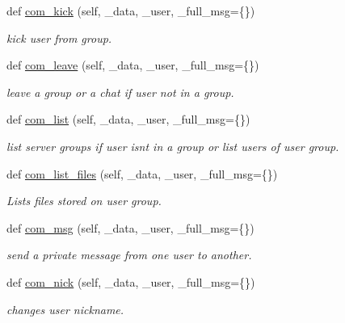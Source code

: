 \begin{DoxyCompactItemize}
def \hyperlink{classlib_1_1server_1_1_server_ac47e8a01071e003d2c1401a55d055132}{com\+\_\+kick} (self, \+\_\+data, \+\_\+user, \+\_\+full\+\_\+msg=\{\})
\begin{DoxyCompactList}\small\item\em kick user from group. \end{DoxyCompactList}\item 
def \hyperlink{classlib_1_1server_1_1_server_aca808a3a7ea205cef5c0d556c8b03ecf}{com\+\_\+leave} (self, \+\_\+data, \+\_\+user, \+\_\+full\+\_\+msg=\{\})
\begin{DoxyCompactList}\small\item\em leave a group or a chat if user not in a group. \end{DoxyCompactList}\item 
def \hyperlink{classlib_1_1server_1_1_server_a9fcc590e919c1877295ed150f851b469}{com\+\_\+list} (self, \+\_\+data, \+\_\+user, \+\_\+full\+\_\+msg=\{\})
\begin{DoxyCompactList}\small\item\em list server groups if user isn\textquotesingle{}t in a group or list users of user group. \end{DoxyCompactList}\item 
def \hyperlink{classlib_1_1server_1_1_server_a17bdb51a017c2a09b95fff98da8d64ad}{com\+\_\+list\+\_\+files} (self, \+\_\+data, \+\_\+user, \+\_\+full\+\_\+msg=\{\})
\begin{DoxyCompactList}\small\item\em Lists files stored on user group. \end{DoxyCompactList}\item 
def \hyperlink{classlib_1_1server_1_1_server_ae632e88e7a3e8d83bf8a7efdcab61cf2}{com\+\_\+msg} (self, \+\_\+data, \+\_\+user, \+\_\+full\+\_\+msg=\{\})
\begin{DoxyCompactList}\small\item\em send a private message from one user to another. \end{DoxyCompactList}\item 
def \hyperlink{classlib_1_1server_1_1_server_aa791030280251ab267ac52f13254147d}{com\+\_\+nick} (self, \+\_\+data, \+\_\+user, \+\_\+full\+\_\+msg=\{\})
\begin{DoxyCompactList}\small\item\em changes user nickname. \end{DoxyCompactList}\end{DoxyCompactItemize}
